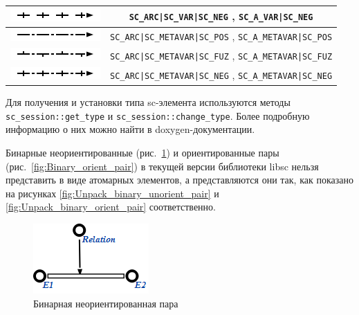 \begin{table}[ht]
\begin{tabular}{|c|c|}
    \hline
	\includegraphics{images/4/scg2sc/pair_var_perm_neg} & \verb+SC_ARC|SC_VAR|SC_NEG+
    , \verb+SC_A_VAR|SC_NEG+ \\
    
    \hline
	\includegraphics{images/4/scg2sc/pair_meta_perm_pos} & \verb+SC_ARC|SC_METAVAR|SC_POS+
    , \verb+SC_A_METAVAR|SC_POS+ \\
    
    \hline
	\includegraphics{images/4/scg2sc/pair_meta_perm_fuz} & \verb+SC_ARC|SC_METAVAR|SC_FUZ+
    , \verb+SC_A_METAVAR|SC_FUZ+ \\
    
    \hline
	\includegraphics{images/4/scg2sc/pair_meta_perm_neg} & \verb+SC_ARC|SC_METAVAR|SC_NEG+
    , \verb+SC_A_METAVAR|SC_NEG+ \\
    
    \hline
  \end{tabular}
  \label{tab:SCgType2SCType}
\end{table}

Для получения и установки типа sc-элемента используются методы
\lstinline{sc_session::get_type} и
\lstinline{sc_session::change_type}. Более подробную информацию о них
можно найти в doxygen-документации.

Бинарные неориентированные (рис.~\ref{fig:Binary_unorient_pair}) и
ориентированные пары (рис.~\ref{fig:Binary_orient_pair}) в текущей
версии библиотеки libsc нельзя представить в виде атомарных элементов,
а представляются они так, как показано на рисунках
\ref{fig:Unpack_binary_unorient_pair} и
\ref{fig:Unpack_binary_orient_pair} соответственно.

\begin{figure}[h]
  \centering
  \includegraphics{images/4/scg2sc/Binary_unorient_pair}
  \caption{Бинарная неориентированная пара}
  \label{fig:Binary_unorient_pair}
\end{figure}

